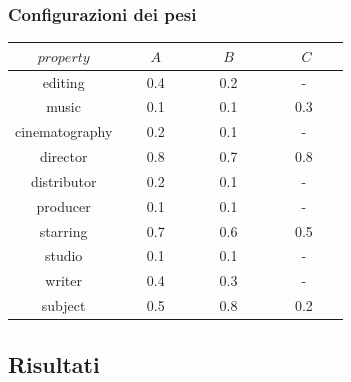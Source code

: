 \documentclass{beamer}
\begin{document}

\begin{frame}
\frametitle{Configurazioni dei pesi}

\begin{center}
\begin{tabular}{c | ccc}
        \toprule
        $property$ & ~~~$A$~~~ & ~~~$B$~~~ & ~~~ $C$~~~ \\
        \hline
        editing			& 0.4 & 0.2 & - \\
        music			& 0.1 & 0.1 & 0.3 \\
        cinematography 	& 0.2 & 0.1 & - \\
        director		& 0.8 & 0.7 & 0.8 \\
        distributor 	& 0.2 & 0.1 & - \\
        producer		& 0.1 & 0.1 & - \\
        starring		& 0.7 & 0.6 & 0.5 \\
        studio			& 0.1 & 0.1 & - \\
        writer			& 0.4 & 0.3 & - \\
        subject			& 0.5 & 0.8 & 0.2 \\
        \bottomrule
        \end{tabular}
\end{center}
\end{frame}

\subsection{Risultati}
\end{document}
